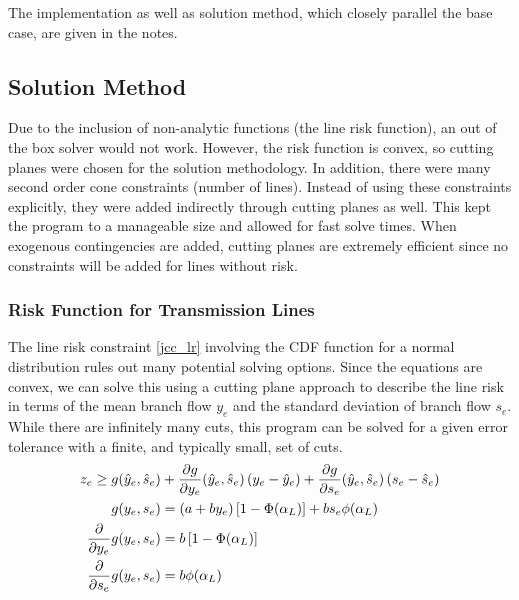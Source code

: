 The implementation as well as solution method, which closely parallel the base case, are given in the notes.
\endnote{}

\subsection{Solution Method}
Due to the inclusion of non-analytic functions (the line risk function), an out of the box solver would not work.  However, the risk function is convex, so cutting planes were chosen for the solution methodology.  In addition, there were many second order cone constraints (number of lines).  Instead of using these constraints explicitly, they were added indirectly through cutting planes as well.  This kept the program to a manageable size and allowed for fast solve times.  When exogenous contingencies are added, cutting planes are extremely efficient since no constraints will be added for lines without risk.


\subsubsection*{Risk Function for Transmission Lines}
The line risk constraint \ref{jcc_lr} involving the CDF function for a normal distribution rules out many potential solving options.  Since the equations are convex, we can solve this using a cutting plane approach to describe the line risk in terms of the mean branch flow $y_e$ and the standard deviation of branch flow $s_e$.  While there are infinitely many cuts, this program can be solved for a given error tolerance with a finite, and typically small, set of cuts.
\begin{subequations}
\label{line_risk_cuts}
\begin{align}
z_e \geq g(\hat{y}_e,\hat{s}_e) &+ \frac{\partial g}{\partial y_e}(\hat{y}_e,\hat{s}_e) \left(y_e - \hat{y}_e \right) 
+ \frac{\partial g}{\partial s_e}(\hat{y}_e,\hat{s}_e) \left(s_e - \hat{s}_e \right) \\
g(y_e,s_e) &= (a + b y_e)\left[ 1 - \Phi(\alpha_L) \right]  + b s_e \phi(\alpha_L)  \\
 \frac{\partial}{\partial y_e}g(y_e,s_e) &= b\left[ 1 - \Phi(\alpha_L) \right]\\
\frac{\partial}{\partial s_e}g(y_e,s_e) &= b \phi(\alpha_L) 
\end{align}
\end{subequations}


